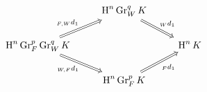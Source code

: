 \documentclass[crop,dvisvgm]{standalone}
\begin{document}
\[\begin {tikzcd}
      & \operatorname {H}^n\operatorname {Gr}_W^q K
        \ar [Rightarrow,dr,"{}_Wd_1"]
    \\\operatorname {H}^n\operatorname {Gr}_F^p\operatorname {Gr}_W^q K
        \ar [Rightarrow,ur,"{}_{F,W}d_1"]
        \ar [Rightarrow,dr,swap,"{}_{W,F}d_1"]
      && \operatorname {H}^n K
    \\& \operatorname {H}^n\operatorname {Gr}_F^p K
        \ar [Rightarrow,ur,swap,"{}_Fd_1"]
    \end {tikzcd}\]
\end{document}
